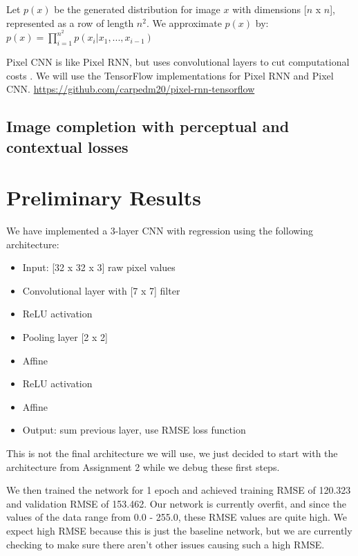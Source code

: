 \documentclass[10pt,twocolumn,letterpaper]{article}
\begin{document}
Let $p(x)$ be the generated distribution for image $x$ with dimensions [$n$ x $n$], represented as a row of length $n^2$. We approximate $p(x)$ by: \\
$p(x) = \prod_{i=1}^{n^2} p(x_i | x_1, ... , x_{i-1} )$

Pixel CNN is like Pixel RNN, but uses convolutional layers to cut computational costs \cite{pixelCNN}. We will use the TensorFlow implementations for Pixel RNN and Pixel CNN. \url{https://github.com/carpedm20/pixel-rnn-tensorflow}

\subsection{Image completion with perceptual and contextual losses}

\section{Preliminary Results}
We have implemented a 3-layer CNN with regression using the following architecture: 

\begin{itemize}
\item Input: [32 x 32 x 3] raw pixel values
\item Convolutional layer with [7 x 7] filter
\item ReLU activation
\item Pooling layer [2 x 2]
\item Affine
\item ReLU activation
\item Affine
\item Output: sum previous layer, use RMSE loss function
\end{itemize}

This is not the final architecture we will use, we just decided to start with the architecture from Assignment 2 while we debug these first steps. 

We then trained the network for 1 epoch and achieved training RMSE of 120.323 and validation RMSE of 153.462. Our network is currently overfit, and since the values of the data range from 0.0 - 255.0, these RMSE values are quite high. We expect high RMSE because this is just the baseline network, but we are currently checking to make sure there aren't other issues causing such a high RMSE.
\end{document}
